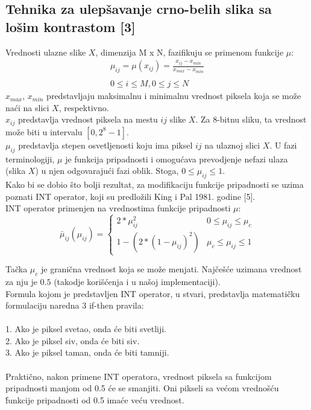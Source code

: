 \documentclass[12pt,a4paper]{article}
\theoremstyle{definition}
\theoremstyle{remark}
\theoremstyle{plain}
\begin{document}
\newpage
\subsection{Tehnika za ulep\v savanje crno-belih slika sa lo\v sim kontrastom [3]}

Vrednosti ulazne slike $X$, dimenzija M x N, fazifikuju se primenom funkcije $\mu$:\\
\begin{align*}
  \mu_{ij} = \mu(x_{ij}) =  \frac{x_{ij} - x_{min}}{x_{max} - x_{min}}\\ \\
  0\leq i \leq M, 0\leq j \leq N
\end{align*}
$x_{max}$, $x_{min}$ predstavljaju maksimalnu i minimalnu vrednost piksela koja se mo\v ze na\' ci na slici $X$, respektivno.\\
$x_{ij}$ predstavlja vrednost piksela na mestu $ij$ slike $X$. Za 8-bitnu sliku, ta vrednost mo\v ze biti u intervalu $[0, 2^8 - 1]$. \\ 
$\mu_{ij}$ predstavlja stepen osvetljenosti koju ima piksel $ij$ na ulaznoj slici $X$. U fazi terminologiji, $\mu$ je funkcija pripadnosti i omogu\' cava 
prevodjenje nefazi ulaza (slika $X$) u njen odgovaraju\' ci fazi oblik.
Stoga, $0\leq \mu_{ij} \leq 1$.\\

Kako bi se dobio \v sto bolji rezultat, za modifikaciju funkcije pripadnosti se uzima poznati INT operator, koji su predlo\v zili King i Pal 1981. godine [5].\\

INT operator primenjen na vrednostima funkcije pripadnosti $\mu$: \\

\[
  \bar\mu_{ij}(\mu_{ij}) = 
    \begin{cases} 
      2 * \mu_{ij}^2 & 0\leq \mu_{ij}\leq \mu_{c} \\
      1 - (2 * (1 - \mu_{ij})^2) & \mu_{c}\leq \mu_{ij}\leq 1 
    \end{cases}
 \]

Ta\v cka $\mu_{c}$ je grani\v cna vrednost koja se mo\v ze menjati. Naj\v ce\v s\' ce uzimana vrednost za nju je $0.5$ 
(takodje kori\v s\' cenja i u na\v soj implementaciji). \\

Formula kojom je predstavljen INT operator, u stvari, predstavlja matemati\v cku formulaciju
naredna 3 if-then pravila: \\ \\
1. Ako je piksel svetao, onda \'ce biti svetliji.\\
2. Ako je piksel siv, onda \'ce biti siv. \\
3. Ako je piksel taman, onda \'ce biti tamniji.\\ \\
Prakti\v cno, nakon primene INT operatora, vrednost piksela sa funkcijom pripadnosti manjom od 0.5 \' ce se smanjiti. Oni pikseli sa ve\' com vredno\v s\' cu \' 
funkcije pripadnosti od 0.5 ima\' ce ve\' cu vrednost.
\\
\end{document}
